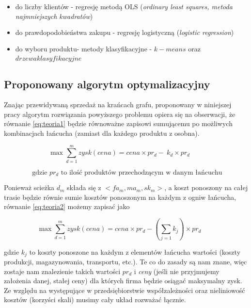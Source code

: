 \documentclass{article}
\begin{document}
	\begin{itemize} 
		\item do liczby klientów - regresję metodą OLS (\textit{ordinary least squares, metoda najmniejszych kwadratów})
		\item do prawdopodobieństwa zakupu - regresję logistyczną (\textit{logistic regression})
		\item do wyboru produktu- metody klasyfikacyjne - $k-means$ oraz $drzewa klasyfikacyjne$
	\end{itemize}

\newpage

\subsection{Proponowany algorytm optymalizacyjny} 
Znając przewidywaną sprzedaż na krańcach grafu, proponowany w niniejszej pracy algorytm rozwiązania powyższego problemu opiera się na obserwacji, że równanie \ref{eq:teoria1} będzie równoważne zapisowi sumującemu po możliwych kombinacjach łańcucha (zamiast dla każdego produktu z osobna).

\begin{equation}  \label{eq:teoria2}
\max \sum\limits_{d=1}^m  zysk(cena) = 
cena \times pr_d -  \ k_d \times pr_d \qquad 
\end{equation}

\begin{equation*}
  \text{ gdzie $pr_d$ to ilość produktów przechodzącym w danym łańcuchu}
\end{equation*}

Ponieważ scieżka $d_m$ składa się z $<fa_m,ma_m,sk_m>$, a koszt ponoszony na całej trasie będzie równie sumie kosztów ponoszonym na każdym z ogniw łańcucha, równanie \ref{eq:teoria2} możemy zapisać jako

\begin{equation} \label{eq:teoria3}
\max \sum\limits_{d=1}^m  zysk(cena) = 
cena \times pr_d -  ( \sum\limits_{j=1} k_j) \times pr_d \qquad 
\end{equation}


gdzie $ k_j$ to koszty ponoszone na każdym z elementów łańcucha wartości (koszty produkcji, magazynowania, transportu, etc.). Te co do zasady są nam znane, więc zostaje nam znalezienie takich wartości $pr_d$ i \textit{ceny} (jeśli nie przyjmujemy założenia danej, stałej ceny) dla których firma będzie osiągać maksymalny zysk. Ze względu na występujące w przedsiębiorstwie współzależności oraz nieliniowość kosztów (korzyści skali) musimy cały układ rozważać łącznie. 
\end{document}
